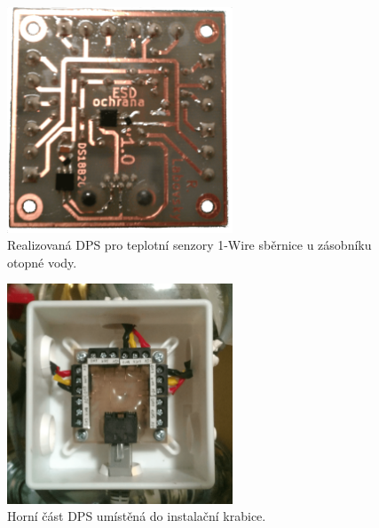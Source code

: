 \begin{figure}[H]
    \centering
    \includegraphics[width=0.6\textwidth]{images/zasobnik-otopne-vody/dps-1-wire-sbernice-u-zasobniku-otopne-vody.png}
    \caption{Realizovaná DPS pro teplotní senzory 1-Wire sběrnice u zásobníku otopné vody.}
    \label{fig:dps-1-wire-sbernice-u-zasobniku-otopne-vody}
\end{figure}

\begin{figure}[H]
    \centering
    \includegraphics[width=0.6\textwidth]{images/zasobnik-otopne-vody/instalacni-krabice-cidla-u-zasobniku-otopne-vody.png}
    \caption{Horní část DPS umístěná do instalační krabice.}
    \label{fig:instalacni-krabice-cidla-u-zasobniku-otopne-vody}
\end{figure}

